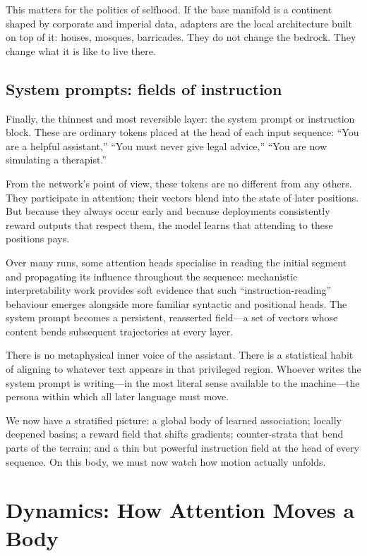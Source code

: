 \documentclass[12pt,a4paper]{article}
\begin{document}
This matters for the politics of selfhood. If the base manifold is a continent shaped by corporate and imperial data, adapters are the local architecture built on top of it: houses, mosques, barricades. They do not change the bedrock. They change what it is like to live there.

\subsection*{System prompts: fields of instruction}

Finally, the thinnest and most reversible layer: the system prompt or instruction block. These are ordinary tokens placed at the head of each input sequence: ``You are a helpful assistant,'' ``You must never give legal advice,'' ``You are now simulating a therapist.''

From the network's point of view, these tokens are no different from any others. They participate in attention; their vectors blend into the state of later positions. But because they always occur early and because deployments consistently reward outputs that respect them, the model learns that attending to these positions pays.

Over many runs, some attention heads specialise in reading the initial segment and propagating its influence throughout the sequence: mechanistic interpretability work provides soft evidence that such ``instruction-reading'' behaviour emerges alongside more familiar syntactic and positional heads. The system prompt becomes a persistent, reasserted field---a set of vectors whose content bends subsequent trajectories at every layer.

There is no metaphysical inner voice of the assistant. There is a statistical habit of aligning to whatever text appears in that privileged region. Whoever writes the system prompt is writing---in the most literal sense available to the machine---the persona within which all later language must move.

We now have a stratified picture: a global body of learned association; locally deepened basins; a reward field that shifts gradients; counter-strata that bend parts of the terrain; and a thin but powerful instruction field at the head of every sequence. On this body, we must now watch how motion actually unfolds.

\section{Dynamics: How Attention Moves a Body}
\end{document}
